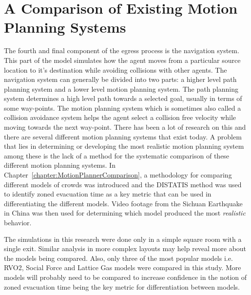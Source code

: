 
\section{A Comparison of Existing Motion Planning Systems} %
\label{sec:a_comparison_of_existing_motion_planning_systems}

The fourth and final component of the egress process is the navigation system. This part of the model simulates how the agent moves from a particular source location to it's destination while avoiding collisions with other agents. The navigation system can generally be divided into two parts: a higher level path planning system and a lower level motion planning system. The path planning system determines a high level path towards a selected goal, usually in terms of some way-points. The motion planning system which is sometimes also called a collision avoidance system helps the agent select a collision free velocity while moving towards the next way-point. There has been a lot of research on this and there are several different motion planning systems that exist today. A problem that lies in determining or developing the most realistic motion planning system among these is the lack of a method for the systematic comparison of these different motion planning systems. In Chapter~\ref{chapter:MotionPlannerComparison}, a methodology for comparing different models of crowds was introduced and the DISTATIS method was used to identify zoned evacuation time as a key metric that can be used in differentiating the different models. Video footage from the Sichuan Earthquake in China was then used for determining which model produced the most \emph{realistic} behavior.




The simulations in this research were done only in a simple square room with a single exit. Similar analysis in more complex layouts may help reveal more about the models being compared. Also, only three of the most popular models i.e. RVO2, Social Force and Lattice Gas models were compared in this study. More models will probably need to be compared to increase confidence in the notion of zoned evacuation time being the key metric for differentiation between models.

